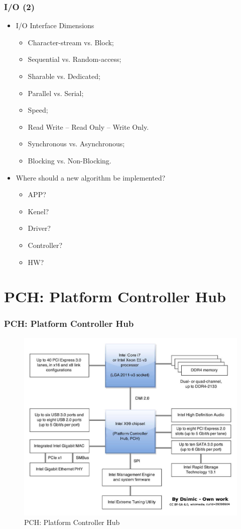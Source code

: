 \documentclass[aspectratio=169, xcolor=table, notheorems, hyperref={pdfpagelabels=false}]{beamer}
\begin{document}
\begin{frame}
\frametitle{I/O (2)}
\begin{itemize}
\item I/O Interface Dimensions
\begin{itemize}
\item Character-stream vs. Block;
\item Sequential vs. Random-access;
\item Sharable vs. Dedicated;
\item Parallel vs. Serial;
\item Speed;
\item Read Write -- Read Only -- Write Only.
\item Synchronous vs. Asynchronous;
\item Blocking vs. Non-Blocking.
\end{itemize}
\item Where should a new algorithm be implemented?
\begin{itemize}
\item APP?
\item Kenel?
\item Driver?
\item Controller?
\item HW?
\end{itemize}
\end{itemize}
\end{frame}

\section{PCH: Platform Controller Hub}
\begin{frame}
\frametitle{PCH: Platform Controller Hub}
\begin{figure}
\includegraphics[width=0.53\linewidth]{os00-x99-chipset-block-diagram}
\caption{PCH: Platform Controller Hub}
\end{figure}
\end{frame}
\end{document}
